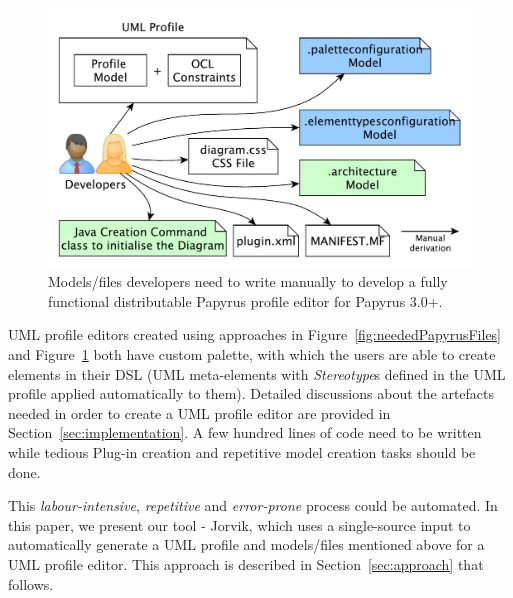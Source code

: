\begin{figure}[ht!]
	\centering
	\includegraphics[width=1\textwidth]{diagrams/neededPapyrusFiles_new.pdf}
	\vspace{-3mm}
	\caption[]{Models/files developers need to write manually to 
		develop a fully functional distributable Papyrus profile editor for Papyrus 3.0+.}
	\label{fig:neededPapyrusFiles_new}
\end{figure}


UML profile editors created using approaches in Figure~\ref{fig:neededPapyrusFiles} and Figure~\ref{fig:neededPapyrusFiles_new} both have custom palette, with which the users are able to create elements in their DSL (UML meta-elements with \textit{Stereotype}s defined in the UML profile applied automatically to them).
Detailed discussions about the artefacts needed in order to create a UML profile editor are provided in Section~\ref{sec:implementation}.
A few hundred lines of code need to be written while tedious Plug-in creation and repetitive model creation tasks should be done. 

This \textit{labour-intensive}, \textit{repetitive} and \textit{error-prone} process could be automated. 
In this paper, we present our tool - Jorvik, which uses a single-source input to automatically generate a UML profile and models/files mentioned above for a UML profile editor. 
This approach is described in Section~\ref{sec:approach} that follows. 

